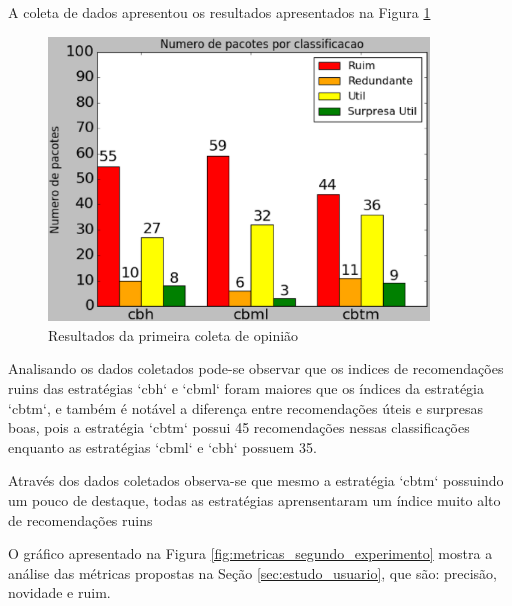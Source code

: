 A coleta de dados apresentou os resultados apresentados na Figura
\ref{fig:primeiro_experimento}

\pagebreak

\begin{figure}[h]
  \centering
  \includegraphics[width=0.9\textwidth]{figuras/primeiro_experimento.eps}
  \caption{Resultados da primeira coleta de opinião}
  \label{fig:primeiro_experimento}
\end{figure}

Analisando os dados coletados pode-se observar que os indices de recomendações
ruins das estratégias `cbh` e `cbml` foram maiores que os índices da estratégia
`cbtm`, e também é notável a diferença entre recomendações úteis e surpresas
boas, pois a estratégia `cbtm` possui 45 recomendações nessas classificações
enquanto as estratégias `cbml` e `cbh` possuem 35.

Através dos dados coletados observa-se que mesmo a estratégia `cbtm` possuindo
um pouco de destaque, todas as estratégias aprensentaram um índice muito alto
de recomendações ruins

O gráfico apresentado na Figura \ref{fig:metricas_segundo_experimento} mostra
a análise das métricas propostas na Seção \ref{sec:estudo_usuario}, que são:
precisão, novidade e ruim.

\pagebreak

